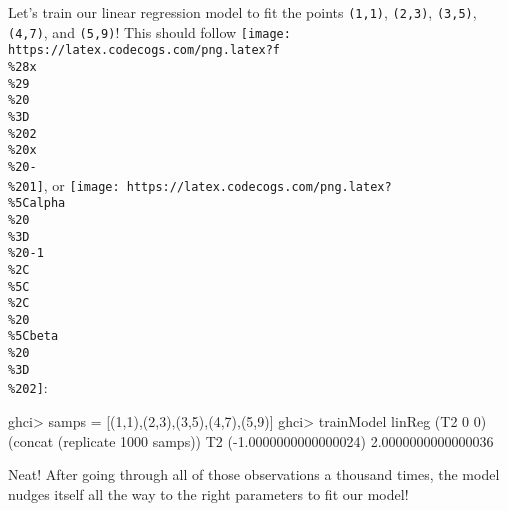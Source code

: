 \documentclass[]{article}
\newenvironment{Shaded}{}{}
\newcommand{\CommentTok}[1]{\textcolor[rgb]{0.38,0.63,0.69}{\textit{#1}}}
\newcommand{\DataTypeTok}[1]{\textcolor[rgb]{0.56,0.13,0.00}{#1}}
\newcommand{\DecValTok}[1]{\textcolor[rgb]{0.25,0.63,0.44}{#1}}
\newcommand{\FloatTok}[1]{\textcolor[rgb]{0.25,0.63,0.44}{#1}}
\newcommand{\FunctionTok}[1]{\textcolor[rgb]{0.02,0.16,0.49}{#1}}
\newcommand{\NormalTok}[1]{#1}
\newcommand{\OtherTok}[1]{\textcolor[rgb]{0.00,0.44,0.13}{#1}}
\begin{document}
\begin{Shaded}
\end{Shaded}

Let's train our linear regression model to fit the points \texttt{(1,1)},
\texttt{(2,3)}, \texttt{(3,5)}, \texttt{(4,7)}, and \texttt{(5,9)}! This should
follow
\texttt{[image: https://latex.codecogs.com/png.latex?f\\\%28x\\\%29\\\%20\\\%3D\\\%202\\\%20x\\\%20-\\\%201]},
or
\texttt{[image: https://latex.codecogs.com/png.latex?\\\%5Calpha\\\%20\\\%3D\\\%20-1\\\%2C\\\%5C\\\%2C\\\%20\\\%5Cbeta\\\%20\\\%3D\\\%202]}:

\begin{Shaded}
\begin{Highlighting}[]
\NormalTok{ghci}\FunctionTok{>}\NormalTok{ samps }\FunctionTok{=}\NormalTok{ [(}\DecValTok{1}\NormalTok{,}\DecValTok{1}\NormalTok{),(}\DecValTok{2}\NormalTok{,}\DecValTok{3}\NormalTok{),(}\DecValTok{3}\NormalTok{,}\DecValTok{5}\NormalTok{),(}\DecValTok{4}\NormalTok{,}\DecValTok{7}\NormalTok{),(}\DecValTok{5}\NormalTok{,}\DecValTok{9}\NormalTok{)]}
\NormalTok{ghci}\FunctionTok{>}\NormalTok{ trainModel linReg (}\DataTypeTok{T2} \DecValTok{0} \DecValTok{0}\NormalTok{) (concat (replicate }\DecValTok{1000}\NormalTok{ samps))}
\DataTypeTok{T2}\NormalTok{ (}\FunctionTok{-}\FloatTok{1.0000000000000024}\NormalTok{) }\FloatTok{2.0000000000000036}
\end{Highlighting}
\end{Shaded}

Neat! After going through all of those observations a thousand times, the model
nudges itself all the way to the right parameters to fit our model!
\end{document}
